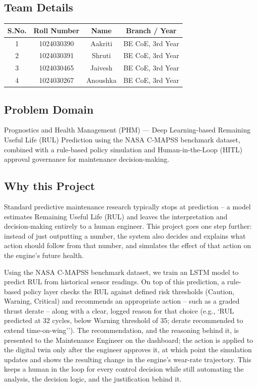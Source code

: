 \documentclass[12pt,a4paper]{report}
\begin{document}
\subsection*{Team Details}
\begin{table}[h]
\centering
\begin{tabular}{|c|c|c|c|}
\hline
\textbf{S.No.} & \textbf{Roll Number} & \textbf{Name} & \textbf{Branch / Year} \\
\hline
1 & 1024030390 & Aakriti  & BE CoE, 3rd Year \\
\hline
2 & 1024030391 & Shruti   & BE CoE, 3rd Year \\
\hline
3 & 1024030465 & Jaivesh  & BE CoE, 3rd Year \\
\hline
4 & 1024030267 & Anoushka & BE CoE, 3rd Year \\
\hline
\end{tabular}
\end{table}
 
\subsection*{Problem Domain}
Prognostics and Health Management (PHM) --- Deep Learning-based Remaining Useful Life (RUL) Prediction using the NASA C-MAPSS benchmark dataset, combined with a rule-based policy simulation and Human-in-the-Loop (HITL) approval governance for maintenance decision-making.

\subsection*{Why this Project}
Standard predictive maintenance research typically stops at prediction -- a model estimates Remaining Useful Life (RUL) and leaves the interpretation and decision-making entirely to a human engineer. This project goes one step further: instead of just outputting a number, the system also decides and explains what action should follow from that number, and simulates the effect of that action on the engine's future health.
 
Using the NASA C-MAPSS benchmark dataset, we train an LSTM model to predict RUL from historical sensor readings. On top of this prediction, a rule-based policy layer checks the RUL against defined risk thresholds (Caution, Warning, Critical) and recommends an appropriate action -- such as a graded thrust derate -- along with a clear, logged reason for that choice (e.g., `RUL predicted at 32 cycles, below Warning threshold of 35; derate recommended to extend time-on-wing''). The recommendation, and the reasoning behind it, is presented to the Maintenance Engineer on the dashboard; the action is applied to the digital twin only after the engineer approves it, at which point the simulation updates and shows the resulting change in the engine's wear-rate trajectory. This keeps a human in the loop for every control decision while still automating the analysis, the decision logic, and the justification behind it.
 
\end{document}
